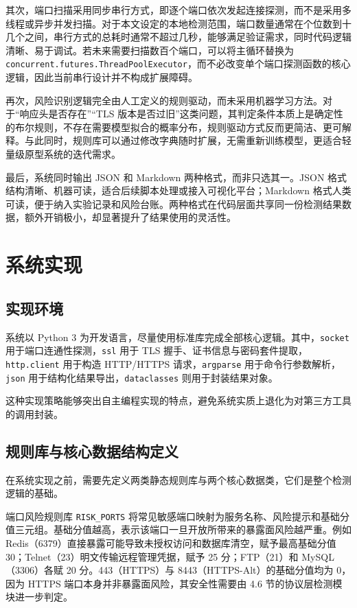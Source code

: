 \documentclass[12pt,a4paper,fontset=none]{ctexart}
\begin{document}
其次，端口扫描采用同步串行方式，即逐个端口依次发起连接探测，而不是采用多线程或异步并发扫描。对于本文设定的本地检测范围，端口数量通常在个位数到十几个之间，串行方式的总耗时通常不超过几秒，能够满足验证需求，同时代码逻辑清晰、易于调试。若未来需要扫描数百个端口，可以将主循环替换为 \texttt{concurrent.futures.ThreadPoolExecutor}，而不必改变单个端口探测函数的核心逻辑，因此当前串行设计并不构成扩展障碍。

再次，风险识别逻辑完全由人工定义的规则驱动，而未采用机器学习方法。对于“响应头是否存在”“TLS 版本是否过旧”这类问题，其判定条件本质上是确定性的布尔规则，不存在需要模型拟合的概率分布，规则驱动方式反而更简洁、更可解释。与此同时，规则库可以通过修改字典随时扩展，无需重新训练模型，更适合轻量级原型系统的迭代需求。

最后，系统同时输出 JSON 和 Markdown 两种格式，而非只选其一。JSON 格式结构清晰、机器可读，适合后续脚本处理或接入可视化平台；Markdown 格式人类可读，便于纳入实验记录和风险台账。两种格式在代码层面共享同一份检测结果数据，额外开销极小，却显著提升了结果使用的灵活性。

\section{系统实现}

\subsection{实现环境}

系统以 Python 3 为开发语言，尽量使用标准库完成全部核心逻辑。其中，\texttt{socket} 用于端口连通性探测，\texttt{ssl} 用于 TLS 握手、证书信息与密码套件提取，\texttt{http.client} 用于构造 HTTP/HTTPS 请求，\texttt{argparse} 用于命令行参数解析，\texttt{json} 用于结构化结果导出，\texttt{dataclasses} 则用于封装结果对象。

这种实现策略能够突出自主编程实现的特点，避免系统实质上退化为对第三方工具的调用封装。

\subsection{规则库与核心数据结构定义}

在系统实现之前，需要先定义两类静态规则库与两个核心数据类，它们是整个检测逻辑的基础。

端口风险规则库 \texttt{RISK\_PORTS} 将常见敏感端口映射为服务名称、风险提示和基础分值三元组。基础分值越高，表示该端口一旦开放所带来的暴露面风险越严重。例如 Redis（6379）直接暴露可能导致未授权访问和数据库清空，赋予最高基础分值 30；Telnet（23）明文传输远程管理凭据，赋予 25 分；FTP（21）和 MySQL（3306）各赋 20 分。443（HTTPS）与 8443（HTTPS-Alt）的基础分值均为 0，因为 HTTPS 端口本身并非暴露面风险，其安全性需要由 4.6 节的协议层检测模块进一步判定。
\end{document}
